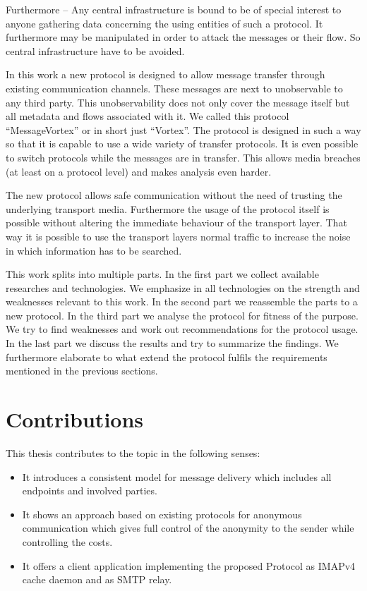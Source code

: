 Furthermore -- Any central infrastructure is bound to be of special interest to anyone gathering data concerning the using entities of such a protocol. It furthermore may be manipulated in order to attack the messages or their flow. So central infrastructure have to be avoided.

In this work a new protocol is designed to allow message transfer through existing communication channels. These messages are next to unobservable to any third party. This unobservability does not only cover the message itself but all metadata and flows associated with it. We called this protocol ``MessageVortex'' or in short just ``Vortex''. The protocol is designed in such a way so that it is capable to use a wide variety of transfer protocols. It is even possible to switch protocols while the messages are in transfer. This allows media breaches (at least on a protocol level) and makes analysis even harder.

The new protocol allows safe communication without the need of trusting the underlying transport media. Furthermore the usage of the protocol itself is possible without altering the immediate behaviour of the transport layer. That way it is possible to use the transport layers normal traffic to increase the noise in which information has to be searched. 

This work splits into multiple parts. In the first part we collect available researches and technologies. We emphasize in all technologies on the strength and weaknesses relevant to this work. In the second part we reassemble the parts to a new protocol. In the third part we analyse the protocol for fitness of the purpose. We try to find weaknesses and work out recommendations for the protocol usage. In the last part we discuss the results and try to summarize the findings. We furthermore elaborate to what extend the protocol fulfils the requirements mentioned in the previous sections.

\section{Contributions}
This thesis contributes to the topic in the following senses:
\begin{itemize}
	\item It introduces a consistent model for message delivery which includes all endpoints and involved parties.
	\item It shows an approach based on existing protocols for anonymous communication which gives full control of the anonymity to the sender while controlling the costs.
	\item It offers a client application implementing the proposed Protocol as IMAPv4 cache daemon and as SMTP relay.
\end{itemize}

